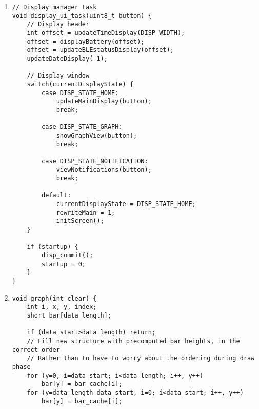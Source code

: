 \begin{enumerate}[label=\textbf{S.\arabic*},ref=S.\arabic*{ of Appendix A}]
\begin{adjustwidth}{-2em}{0pt}
\begin{lstlisting}
        // We need to set a timeout for screen if it was freshly activated
        if (screen_request || buttons) { // i.e. by explicit request or button press
            screen_request = 0;

            // Wakeup screen if needed
            if (screen_sleep) {
                screen_sleep = 0;
                disp_sleep_disable();
            }

            set_screen_timeout(SCREEN_TIMEOUT);
        }
    } else {
        // Trigger battery timer for next screen activation
        set_battery_timeout(0);

        if (!screen_sleep) {
            display_off();
            screen_sleep = 1;
        }
    }
}
\end{lstlisting}
\end{adjustwidth}
\doublespacing

\item \label{display_ui_task}
\begin{adjustwidth}{-2em}{0pt}
\singlespacing
\nl
\begin{lstlisting}
// Display manager task
void display_ui_task(uint8_t button) {
    // Display header
    int offset = updateTimeDisplay(DISP_WIDTH);
    offset = displayBattery(offset);
    offset = updateBLEstatusDisplay(offset);
    updateDateDisplay(-1);

    // Display window
    switch(currentDisplayState) {
        case DISP_STATE_HOME:
            updateMainDisplay(button);
            break;

        case DISP_STATE_GRAPH:
            showGraphView(button);
            break;

        case DISP_STATE_NOTIFICATION:
            viewNotifications(button);
            break;

        default:
            currentDisplayState = DISP_STATE_HOME;
            rewriteMain = 1;
            initScreen();
    }

    if (startup) {
        disp_commit();
        startup = 0;
    }
}
\end{lstlisting}
\end{adjustwidth}
\doublespacing

\item \label{graph}
\begin{adjustwidth}{-2em}{0pt}
\singlespacing
\nl
\begin{lstlisting}
void graph(int clear) {
    int i, x, y, index;
    short bar[data_length];

    if (data_start>data_length) return;
    // Fill new structure with precomputed bar heights, in the correct order
    // Rather than to have to worry about the ordering during draw phase
    for (y=0, i=data_start; i<data_length; i++, y++)
        bar[y] = bar_cache[i];
    for (y=data_length-data_start, i=0; i<data_start; i++, y++)
        bar[y] = bar_cache[i];


\end{lstlisting}
\end{adjustwidth}
\end{enumerate}
